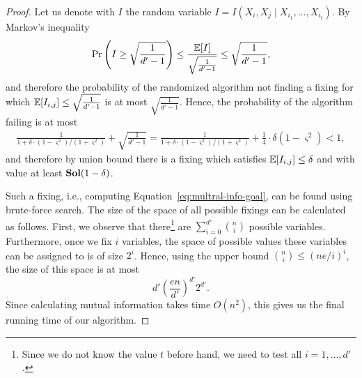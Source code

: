 \begin{proof}
	\par
	Let us denote with $I$ the random variable $I=I(X_i,X_j \mid X_{i_1},\hdots,X_{i_t})$.  By Markov's inequality
	\begin{equation*}
		\Pr \left( I \geq \sqrt{\frac{1}{d'-1}} \right) \leq  \frac{\operatorname*{\mathbb{E}}[I]}{\sqrt{\frac{1}{d'-1}} } \leq \sqrt{\frac{1}{d'-1}},
	\end{equation*}
	and therefore the probability of the randomized algorithm not finding a fixing for which $\operatorname*{\mathbb{E}}[I_{i,j}] \leq \sqrt{\frac{1}{d'-1}}$ is at most $\sqrt{\frac{1}{d'-1}}$. Hence, the probability of the algorithm failing is at most 
	\begin{equation*}
		\begin{split}
		\frac{1}{1+\delta \cdot (1-\varsigma^{2})/(1+\varsigma^{2})} + \sqrt{\frac{1}{d'-1}}
		= \frac{1}{1+\delta\cdot (1-\varsigma^{2})/(1+\varsigma^{2})}  + \frac{1}{4}\cdot \delta(1-\varsigma^2) <1,
		\end{split}
	\end{equation*}
	and therefore by union bound there is a fixing which satisfies $\operatorname*{\mathbb{E}}[I_{i,j}] \leq \delta$ and with value at least 
	$\mathbf{Sol}(1-\delta)$.

	\par 
Such a fixing, i.e., computing Equation~\eqref{eq:multral-info-goal}, can be found using brute-force search. The size of the space of all possible fixings can be calculated
	as follows. First, we observe that there\footnote{Since we do not know the value $t$  before hand, we need to test all $i=1,\hdots,d'$.} are
	$\sum_{i=0}^{d'} {n \choose i} $ possible variables. Furthermore, once we fix $i$  variables, the space of possible 
	values these variables can be assigned to is of size $2^{i}$. Hence, using the upper bound ${n \choose i} \leq (n e / i ) ^ i$, the size of this space is at most 
	\begin{equation*}
		d' \left( \frac{en}{d'}\right)^{d'} 2^{d'}.
	\end{equation*}
	Since calculating mutual information takes time $O(n^{2})$, this gives us the final running time of our algorithm.
\end{proof}

